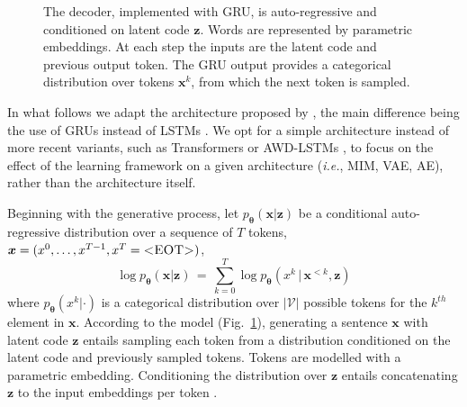 \documentclass{article}
\newcommand{\bs}{\boldsymbol}
\newcommand{\ie}{{\em i.e.}}
\newcommand{\x}{{\bs{x}}}
\newcommand{\z}{{\bs z}}
\newcommand{\params}{{\bs \theta}}
\newcommand{\pdec}{p}
\newcommand{\Mdec}{\pdec_{\params}}
\begin{document}
\begin{figure}[t]
{ }
\vspace*{-0.6cm}
    \caption{The decoder, implemented with GRU, is auto-regressive and conditioned on latent code $\z$.
    Words are represented by parametric embeddings.
    At each step the inputs are the latent code and previous output token.
    The GRU output provides a categorical distribution over tokens $\x^k$,    from which the next token is sampled.
}
    \label{fig:sentence-mim-arch-decoder}
\end{figure}


In what follows we adapt the architecture proposed by \citet{DBLP:journals/corr/BowmanVVDJB15}, 
the main difference being the use of GRUs \citep{cho-etal-2014-learning} instead of LSTMs \citep{Hochreiter:1997:LSM:1246443.1246450}.
We opt for a simple architecture instead of more recent variants, such as Transformers \citep{Vaswani2017}
or AWD-LSTMs \citep{merity2018regularizing}, to focus on the effect of the learning framework on a given architecture (\ie, MIM, VAE, AE), 
rather than the architecture itself.

Beginning with the generative process, let $\Mdec(\x|\z) $ be a conditional auto-regressive distribution 
over a sequence of $T$ tokens, $\x = (x^{0},\ldots, x^{T-1}, x^{T} = \text{\textsc{<EOT>}})$,
\begin{equation}
    \log \Mdec(\x|\z) \, =\, \sum_{k=0}^{T} \log \Mdec(x^k\, |\, \x^{<k}, \z)
    \label{eq:p-x-seq-given-z}
\end{equation}
where $\Mdec(x^k | \cdot )$ is a categorical distribution over $|\mathcal{V}|$
possible tokens for the $k^{th}$ element in $\x$.
According to the model (Fig.\ \ref{fig:sentence-mim-arch-decoder}), generating
a sentence $\x$ with latent code $\z$ entails sampling each token from a
distribution conditioned on the latent code and previously sampled tokens.
Tokens are modelled with a parametric embedding. Conditioning the distribution over $\z$
entails concatenating $\z$ to the input embeddings per token \citep{DBLP:journals/corr/BowmanVVDJB15}.
\end{document}
